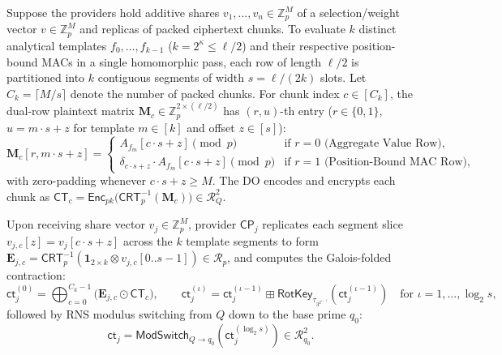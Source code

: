 \documentclass[11pt,a4paper]{article}
\begin{document}
Suppose the providers hold additive shares $v_1, \dots, v_n \in \mathbb{Z}_p^M$ of a selection/weight vector $v \in \mathbb{Z}_p^M$ and replicas of packed ciphertext chunks. To evaluate $k$ distinct analytical templates $f_0, \dots, f_{k-1}$ ($k = 2^\kappa \le \ell/2$) and their respective position-bound MACs in a single homomorphic pass, each row of length $\ell/2$ is partitioned into $k$ contiguous segments of width $s = \ell/(2k)$ slots. Let $C_k = \lceil M / s \rceil$ denote the number of packed chunks. For chunk index $c \in [C_k]$, the dual-row plaintext matrix $\mathbf{M}_{c} \in \mathbb{Z}_p^{2 \times (\ell/2)}$ has $(r, u)$-th entry ($r \in \{0,1\}$, $u = m \cdot s + z$ for template $m \in [k]$ and offset $z \in [s]$):
\begin{equation}\label{eq:matrix_pack}
    \mathbf{M}_c[r, m \cdot s + z] = 
    \begin{cases}
        A_{f_m}[c \cdot s + z] \pmod{p} & \text{if } r = 0 \text{ (Aggregate Value Row)}, \\[4pt]
        \delta_{c \cdot s + z} \cdot A_{f_m}[c \cdot s + z] \pmod{p} & \text{if } r = 1 \text{ (Position-Bound MAC Row)},
    \end{cases}
\end{equation}
with zero-padding whenever $c \cdot s + z \ge M$. The DO encodes and encrypts each chunk as $\mathsf{CT}_c = \mathsf{Enc}_{pk}\big(\mathsf{CRT}_p^{-1}(\mathbf{M}_c)\big) \in \mathcal{R}_Q^2$.

Upon receiving share vector $v_j \in \mathbb{Z}_p^M$, provider $\mathsf{CP}_j$ replicates each segment slice $v_{j,c}[z] = v_j[c \cdot s + z]$ across the $k$ template segments to form $\mathbf{E}_{j,c} = \mathsf{CRT}_p^{-1}(\mathbf{1}_{2 \times k} \otimes v_{j,c}[0..s-1]) \in \mathcal{R}_p$, and computes the Galois-folded contraction:
\begin{equation}\label{eq:galois_fold}
    \mathsf{ct}_j^{(0)} = \bigoplus_{c=0}^{C_k - 1} \big(\mathbf{E}_{j,c} \odot \mathsf{CT}_c\big), \qquad
    \mathsf{ct}_j^{(\iota)} = \mathsf{ct}_j^{(\iota-1)} \boxplus \mathsf{RotKey}_{\tau_{3^{2^{\iota-1}}}}\!\left(\mathsf{ct}_j^{(\iota-1)}\right) \quad \text{for } \iota = 1, \dots, \log_2 s,
\end{equation}
followed by RNS modulus switching from $Q$ down to the base prime $q_0$:
\begin{equation}\label{eq:mod_switch}
    \mathsf{ct}_j = \mathsf{ModSwitch}_{Q \to q_0}\!\left(\mathsf{ct}_j^{(\log_2 s)}\right) \in \mathcal{R}_{q_0}^2.
\end{equation}
\end{document}
